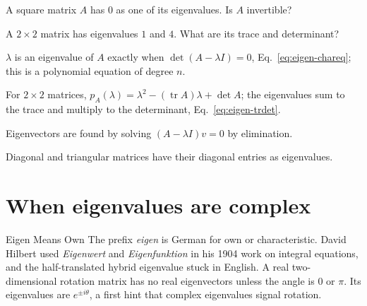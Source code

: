 \begin{checkpoint}
A square matrix $A$ has $0$ as one of its eigenvalues. Is $A$ invertible?
\end{checkpoint}

\begin{checkpoint}
A $2\times2$ matrix has eigenvalues $1$ and $4$. What are its trace and determinant?
\end{checkpoint}

\begin{keyideas}
\item $\lambda$ is an eigenvalue of $A$ exactly when $\det(A-\lambda I)=0$, Eq.~\eqref{eq:eigen-chareq}; this is a polynomial equation of degree $n$.
\item For $2\times2$ matrices, $p_A(\lambda)=\lambda^2-(\operatorname{tr}A)\lambda+\det A$; the eigenvalues sum to the trace and multiply to the determinant, Eq.~\eqref{eq:eigen-trdet}.
\item Eigenvectors are found by solving $(A-\lambda I)v=0$ by elimination.
\item Diagonal and triangular matrices have their diagonal entries as eigenvalues.
\end{keyideas}

\section{When eigenvalues are complex}\label{sec:eigen-complex}
\begin{didyouknow}{Eigen Means Own}
The prefix \emph{eigen} is German for own or characteristic. David Hilbert used \emph{Eigenwert} and \emph{Eigenfunktion} in his 1904 work on integral equations, and the half-translated hybrid eigenvalue stuck in English. A real two-dimensional rotation matrix has no real eigenvectors unless the angle is $0$ or $\pi$. Its eigenvalues are $e^{\pm i\theta}$, a first hint that complex eigenvalues signal rotation.
\end{didyouknow}


